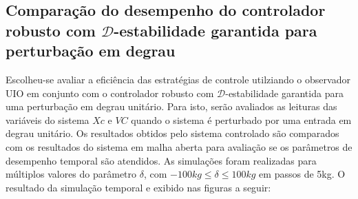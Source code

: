 \subsection{Comparação do desempenho do controlador robusto com \( \mathcal{D}\)-estabilidade garantida para perturbação em degrau}
Escolheu-se avaliar a eficiência das estratégias de controle utilziando o observador UIO em conjunto com o controlador robusto com \( \mathcal{D}\)-estabilidade garantida para uma perturbação em degrau unitário. Para isto, serão avaliados as leituras das variáveis do sistema $Xc$ e $VC$ quando o sistema é perturbado por uma entrada em degrau unitário. Os resultados obtidos pelo sistema controlado são comparados com os resultados do sistema em malha aberta para avaliação se os parâmetros de desempenho temporal são atendidos. As simulações foram realizadas para múltiplos valores do parâmetro $\delta$, com $-100kg\leq \delta\leq 100kg$ em passos de 5kg. O resultado da simulação temporal e exibido nas figuras a seguir:

